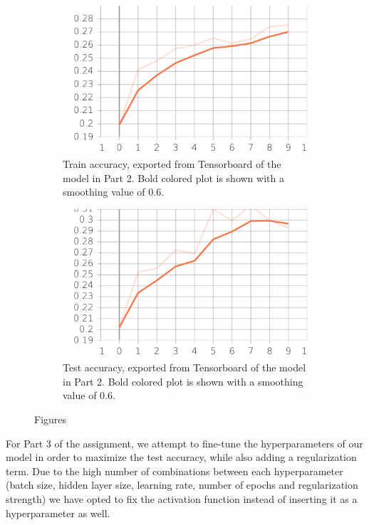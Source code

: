 \documentclass{article}
\begin{document}
    \begin{figure}
    	\begin{subfigure}{0.55\textwidth}
    		\centering
    		\includegraphics[width=\textwidth]{images/train_accuracy.pdf}
    		\caption{Train accuracy, exported from Tensorboard of the model in Part 2. Bold colored plot is shown with a smoothing value of 0.6.}
    	\end{subfigure}
    	\captionsetup{justification=centering}
    	\hspace{0.05\textwidth}
    	\begin{subfigure}{0.45\textwidth}
    		\centering
    		\includegraphics[width=\textwidth]{images/test_accuracy.pdf}
    		\caption{Test accuracy, exported from Tensorboard of the model in Part 2. Bold colored plot is shown with a smoothing value of 0.6.}
    	\end{subfigure}
    	\caption{Figures}
    \end{figure}

For Part 3 of the assignment, we attempt to fine-tune the hyperparameters of our model in order to maximize the test accuracy, while also adding a regularization term. Due to the high number of combinations between each hyperparameter (batch size, hidden layer size, learning rate, number of epochs and regularization strength) we have opted to fix the activation function instead of inserting it as a hyperparameter as well. \\
\end{document}
